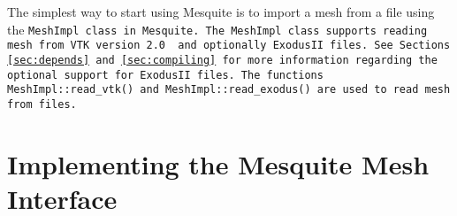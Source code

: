 The simplest way to start using Mesquite is to import a mesh from a file
using the \tt{MeshImpl} class in Mesquite.  The \tt{MeshImpl} class supports reading
mesh from VTK version 2.0 \cite{VTKbook, VTKuml} and optionally ExodusII
files. See Sections \ref{sec:depends} and \ref{sec:compiling} for more 
information regarding the optional support for ExodusII files.
The functions \texttt{MeshImpl::read\_vtk()}
and \texttt{MeshImpl::read\_exodus()} are used to read mesh from files.

\section{Implementing the Mesquite Mesh Interface} \label{sec:msq_mesh}

%
%

%


